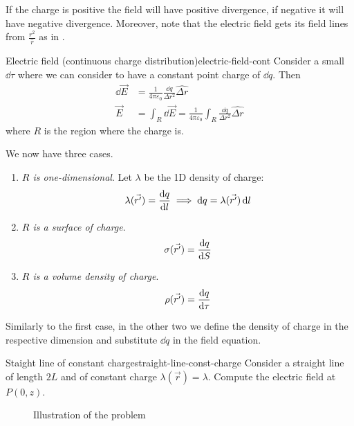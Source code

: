 \documentclass[12pt]{extarticle}
\begin{document}
If the charge is positive the field will have positive divergence, if negative it will have negative divergence.
Moreover, note that the electric field gets its field lines from $\frac{r^2}{\hat r}$ as in .

\begin{definition}{Electric field (continuous charge distribution)}{electric-field-cont}
	Consider a small $\dd{\tau}$ where we can consider to have a constant point charge of $\dd{q}$.
	Then
	\begin{align}
		\dd{\vec E} & = \frac{1}{4\pi \varepsilon_0} \frac{\dd{q}}{\Delta r^2} \hat{\Delta r}                             \\
		\vec E      & = \int_R \dd{\vec E} = \frac{1}{4\pi \varepsilon_0} \int_R \frac{\dd{q}}{\Delta r^2} \hat{\Delta r}
	\end{align}
	where $R$ is the region where the charge is.
\end{definition}

We now have three cases.
\begin{enumerate}
	\item \emph{$R$ is one-dimensional}.
	      Let $\lambda$ be the 1D density of charge:
	      \begin{equation}
		      \lambda(\vec {r'}) = \dv{q}{l} \implies \dd{q} = \lambda (\vec {r'}) \dd{l}
	      \end{equation}
	\item \emph{$R$ is a surface of charge}.
	      \begin{equation}
		      \sigma(\vec {r'}) = \dv{q}{S}
	      \end{equation}
	\item \emph{$R$ is a volume density of charge}.
	      \begin{equation}
		      \rho(\vec {r'}) = \dv{q}{\tau}
	      \end{equation}
\end{enumerate}
Similarly to the first case, in the other two we define the density of charge in the respective dimension and substitute $\dd{q}$ in the field equation.

\begin{example}{Staight line of constant charge}{straight-line-const-charge}
	Consider a straight line of length $2L$ and of constant charge $\lambda(\vec r) = \lambda$.
	Compute the electric field at $P(0,z)$.

	\begin{figure}[H]
		\centering
		
		\caption{Illustration of the problem}
	\end{figure}
\end{example}
\end{document}
